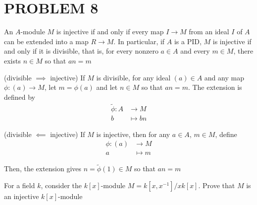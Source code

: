 \section{PROBLEM 8}

\begin{lemma}
	An $A$-module $M$ is injective if and only if every map $I \to M$ from an ideal $I$ of $A$ can be extended into a map $R \to M$. In particular, if $A$ is a PID, $M$ is injective if and only if it is divisible, that is, for every nonzero $a \in A$ and every $m \in M$, there exists $n \in M$ so that $an = m$
\end{lemma}

\begin{longproof}
	(divisible $\implies$ injective) If $M$ is divisible, for any ideal $(a) \in A$ and any map $\phi: (a) \to M$, let $m = \phi(a)$ and let $n \in M$ so that $an = m$. The extension is defined by
	\begin{align*}
		\tilde{\phi}: A &\to M \\
							b &\mapsto bn
	\end{align*}
	
	(divisible $\impliedby$ injective) If $M$ is injective, then for any $a \in A$, $m \in M$, define
	\begin{align*}
		\phi: (a) &\to M \\
				a &\mapsto m
	\end{align*}
	
	Then, the extension gives $n = \tilde{\phi}(1) \in M$ so that $an = m$
\end{longproof}

\begin{problem}[problem 8]
	For a field $k$, consider the $k[x]$-module $M = k[x, x^{-1}] / x k[x]$. Prove that $M$ is an injective $k[x]$-module
\end{problem}

